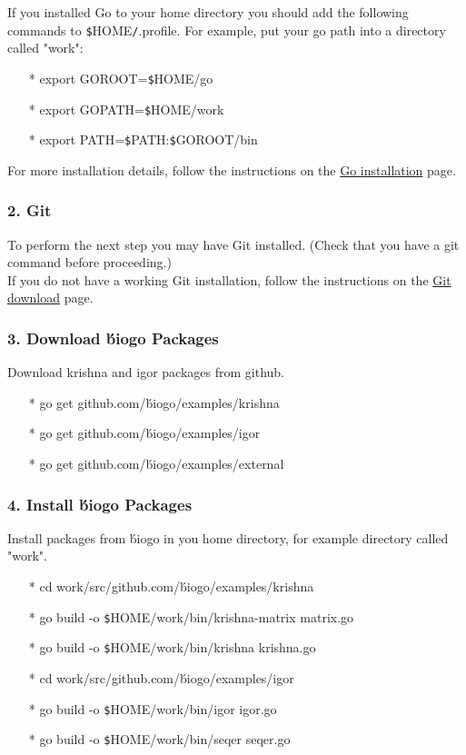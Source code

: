 \documentclass[12pt]{report}
\begin{document}
\noindent If you installed Go to your home directory you should add the following commands to \texttt{\$}HOME\texttt{/}.profile. For example, put your go path into a directory called "work":

\begin{enumerate}
	\item[*] export GOROOT=\texttt{\$}HOME/go
	\item[*] export GOPATH=\texttt{\$}HOME/work
	\item[*] export PATH=\texttt{\$}PATH:\texttt{\$}GOROOT/bin
	
\end{enumerate}

For more installation details, follow the instructions on the \href{https://golang.org/doc/install#install} {\color{blue}Go installation} page.


\subsubsection{2. Git}
To perform the next step you may have Git installed. (Check that you have a git command before proceeding.) \\

If you do not have a working Git installation, follow the instructions on the \href{https://git-scm.com/downloads}{\color{blue}Git download} page.

\subsubsection{3. Download \'biogo Packages}
Download krishna and igor packages from github.

\begin{enumerate}
\item[*] go get github.com/\'biogo/examples/krishna
\item[*] go get github.com/\'biogo/examples/igor
\item[*] go get github.com/\'biogo/examples/external
\end{enumerate}

\subsubsection{4. Install \'biogo Packages}
Install packages from \'biogo in you home directory, for example directory called "work".
\begin{enumerate}
	\item[*] cd work/src/github.com/\'biogo/examples/krishna
	\item[*] go build -o \texttt{\$}HOME/work/bin/krishna-matrix matrix.go
	\item[*] go build -o \texttt{\$}HOME/work/bin/krishna krishna.go
	\item[*] cd work/src/github.com/\'biogo/examples/igor
	\item[*] go build -o \texttt{\$}HOME/work/bin/igor igor.go
	\item[*] go build -o \texttt{\$}HOME/work/bin/seqer seqer.go
\end{enumerate}
\end{document}
